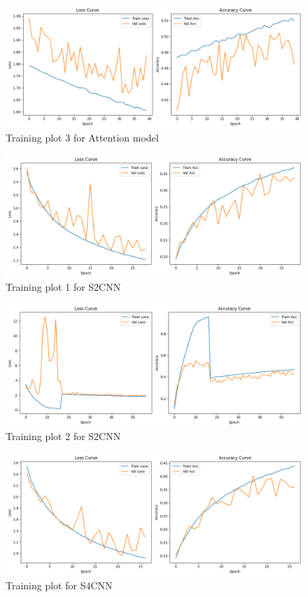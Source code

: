 \documentclass[12pt]{article}
\begin{document}
\begin{figure}[H]
\centering
\includegraphics[width=0.8\linewidth]{results/Attention3.png}
\caption{Training plot 3 for Attention model}
\end{figure}

\begin{figure}[H]
\centering
\includegraphics[width=0.8\linewidth]{results/S2CNN_1.png}
\caption{Training plot 1 for S2CNN}
\end{figure}


\begin{figure}[H]
\centering
\includegraphics[width=0.8\linewidth]{results/S2CNN_2.png}
\caption{Training plot 2 for S2CNN}
\end{figure}


\begin{figure}[H]
\centering
\includegraphics[width=0.8\linewidth]{results/S4CNN.png}
\caption{Training plot for S4CNN}
\end{figure}
\end{document}

